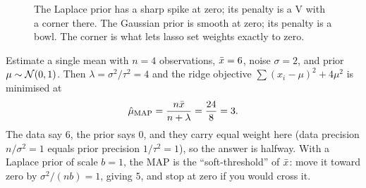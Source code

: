 \begin{figure}[H]
\centering
{}
\caption{The Laplace prior has a sharp spike at zero; its penalty is a V with a corner
there. The Gaussian prior is smooth at zero; its penalty is a bowl. The corner is what
lets lasso set weights exactly to zero.}
\label{fig:lik-priors-penalties}
\end{figure}

\begin{example}
Estimate a single mean with $n=4$ observations, $\bar{x} = 6$, noise $\sigma = 2$, and
prior $\mu\sim\mathcal{N}(0,1)$. Then $\lambda = \sigma^2/\tau^2 = 4$ and the ridge
objective $\sum(x_i-\mu)^2 + 4\mu^2$ is minimised at
\[
  \hat\mu_{\text{MAP}} = \frac{n\bar{x}}{n+\lambda} = \frac{24}{8} = 3 .
\]
The data say $6$, the prior says $0$, and they carry equal weight here (data precision
$n/\sigma^2 = 1$ equals prior precision $1/\tau^2 = 1$), so the answer is halfway.
With a Laplace prior of scale $b=1$, the MAP is the ``soft-threshold'' of $\bar{x}$: move
it toward zero by $\sigma^2/(nb) = 1$, giving $5$, and stop at zero if you would cross
it.
\end{example}

